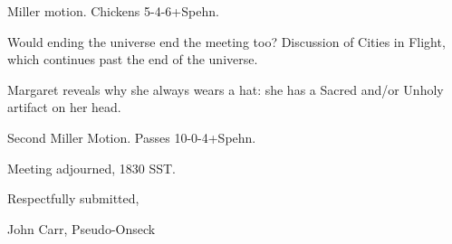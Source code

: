 \documentclass[10pt]{article}
\begin{document}
Miller motion.  Chickens \hbox{5-4-6+Spehn}.

Would ending the universe end the meeting too?
Discussion of Cities in Flight, which continues
past the end of the universe.

Margaret reveals why she always wears a hat: she
has a Sacred and/or Unholy artifact on her head.

Second Miller Motion.  Passes \hbox{10-0-4+Spehn}.

\vspace{12pt}

\noindent
Meeting adjourned, 1830 SST.

\vspace{18pt}

\centerline{Respectfully submitted,}
\centerline{John Carr, Pseudo-Onseck}
\end{document}
